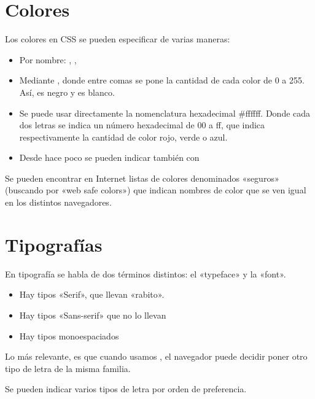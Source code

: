 \documentclass[letterpaper,10pt,spanish]{sphinxmanual}
\begin{document}
\section{Colores}
\label{\detokenize{tema3:colores}}
Los colores en CSS se pueden especificar de varias maneras:
\begin{itemize}
\item {} 
Por nombre: , , 

\item {} 
Mediante , donde entre comas se pone la cantidad de cada color de 0 a 255. Así,  es negro y  es blanco.

\item {} 
Se puede usar directamente la nomenclatura hexadecimal \#ffffff. Donde cada dos letras se indica un número hexadecimal de 00 a ff, que indica respectivamente la cantidad de color rojo, verde o azul.

\item {} 
Desde hace poco se pueden indicar también con 

\end{itemize}

Se pueden encontrar en Internet listas de colores denominados «seguros» (buscando por «web safe colors») que indican nombres de color que se ven igual en los distintos navegadores.


\section{Tipografías}
\label{\detokenize{tema3:tipografias}}
En tipografía se habla de dos términos distintos: el «typeface» y la «font».
\begin{itemize}
\item {} 
Hay tipos «Serif», que llevan «rabito».

\item {} 
Hay tipos «Sans-serif» que no lo llevan

\item {} 
Hay tipos monoespaciados

\end{itemize}

Lo más relevante, es que cuando usamos , el navegador puede decidir poner otro tipo de letra de la misma familia.

Se pueden indicar varios tipos de letra por orden de preferencia.
\end{document}
